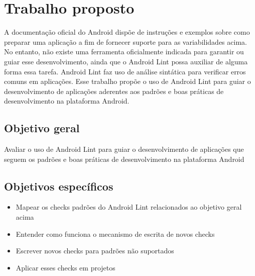 \chapter{Trabalho proposto}

A documentação oficial do Android dispõe de instruções e exemplos sobre como 
preparar uma aplicação a fim de fornecer suporte para as variabilidades acima. 
No entanto, não existe uma ferramenta oficialmente indicada para garantir ou guiar 
esse desenvolvimento, ainda que o Android Lint possa auxiliar de alguma forma essa 
tarefa. Android Lint \cite{lint} faz uso de análise sintática para verificar erros comuns 
em aplicações. Esse trabalho propõe o uso de Android Lint para guiar o desenvolvimento 
de aplicações aderentes aos padrões e boas práticas de desenvolvimento na plataforma Android.

\section{Objetivo geral}
Avaliar o uso de Android Lint para guiar o desenvolvimento de aplicações que seguem 
os padrões e boas práticas de desenvolvimento na plataforma Android

\section{Objetivos específicos}

\begin{itemize}
  \item{Mapear os checks padrões do Android Lint relacionados ao objetivo geral acima}
  \item{Entender como funciona o mecanismo de escrita de novos checks}
  \item{Escrever novos checks para padrões não suportados}
  \item{Aplicar esses checks em projetos}
\end{itemize}
